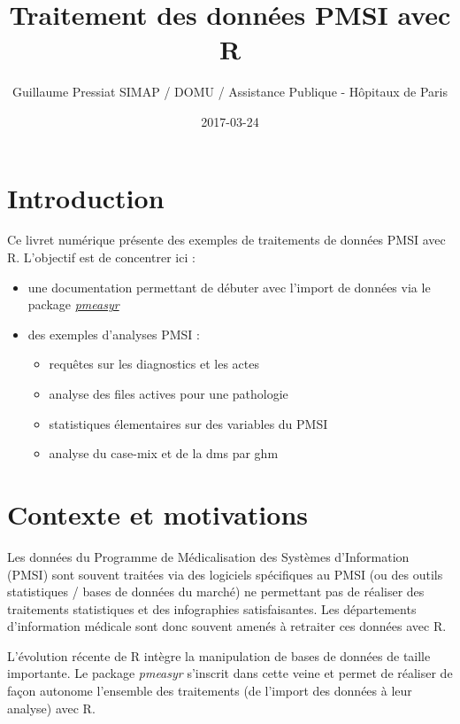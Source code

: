 \documentclass[]{book}
\title{Traitement des données PMSI avec R}
\author{Guillaume Pressiat \textbar{}\textbar{} SIMAP / DOMU / Assistance
Publique - Hôpitaux de Paris}
\date{2017-03-24}
\providecommand{\tightlist}{%
  \setlength{\itemsep}{0pt}\setlength{\parskip}{0pt}}
\begin{document}
\maketitle

{
\setcounter{tocdepth}{1}
\tableofcontents
}
\chapter{Introduction}\label{introduction}

Ce livret numérique présente des exemples de traitements de données PMSI
avec R. L'objectif est de concentrer ici :

\begin{itemize}
\item
  une documentation permettant de débuter avec l'import de données via
  le package \href{https://github.com/IM-APHP/pmeasyr}{\emph{pmeasyr}}
\item
  des exemples d'analyses PMSI :

  \begin{itemize}
  \tightlist
  \item
    requêtes sur les diagnostics et les actes
  \item
    analyse des files actives pour une pathologie
  \item
    statistiques élementaires sur des variables du PMSI
  \item
    analyse du case-mix et de la dms par ghm
  \end{itemize}
\end{itemize}

\chapter{Contexte et motivations}\label{contexte}

Les données du Programme de Médicalisation des Systèmes d'Information
(PMSI) sont souvent traitées via des logiciels spécifiques au PMSI (ou
des outils statistiques / bases de données du marché) ne permettant pas
de réaliser des traitements statistiques et des infographies
satisfaisantes. Les départements d'information médicale sont donc
souvent amenés à retraiter ces données avec R.

L'évolution récente de R intègre la manipulation de bases de données de
taille importante. Le package \emph{pmeasyr} s'inscrit dans cette veine
et permet de réaliser de façon autonome l'ensemble des traitements (de
l'import des données à leur analyse) avec R.
\end{document}
